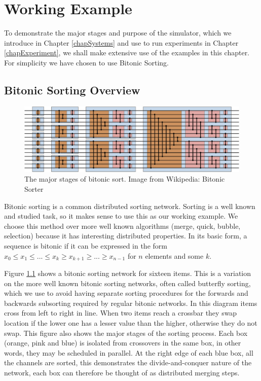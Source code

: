 \chapter{Working Example}
\label{chapExample}

To demonstrate the major stages and purpose of the simulator, which we introduce in Chapter \ref{chapSystems} and use to run experiments in Chapter \ref{chapExperiment}, we shall make extensive use of the examples in this chapter.
For simplicity we have chosen to use Bitonic Sorting.

\section{Bitonic Sorting Overview}

\begin{figure}
\begin{center}
	\includegraphics[width=12cm]{figures/egBitonicSort.eps}
\caption{The major stages of bitonic sort.  Image from Wikipedia: Bitonic Sorter}
\label{figBitonicNormal}
\end{center}
\end{figure}

Bitonic sorting is a common distributed sorting network.
Sorting is a well known and studied task, so it makes sense to use this as our working example.
We choose this method over more well known algorithms (merge, quick, bubble, selection) because it has interesting distributed properties.
In its basic form, a sequence is bitonic if it can be expressed in the form $x_0 \leq x_1 \leq ... \leq x_k \geq x_{k+1} \geq ... \geq x_{n-1}$ for $n$ elements and some $k$.

Figure \ref{figBitonicNormal} shows a bitonic sorting network for sixteen items.
This is a variation on the more well known bitonic sorting networks, often called butterfly sorting, which we use to avoid having separate sorting procedures for the forwards and backwards subsorting required by regular bitonic networks.
In this diagram items cross from left to right in line.
When two items reach a crossbar they swap location if the lower one has a lesser value than the higher, otherwise they do not swap.
This figure also shows the major stages of the sorting process.
Each box (orange, pink and blue) is isolated from crossovers in the same box, in other words, they may be scheduled in parallel.
At the right edge of each blue box, all the channels are sorted, this demonstrates the divide-and-conquer nature of the network, each box can therefore be thought of as distributed merging steps.

